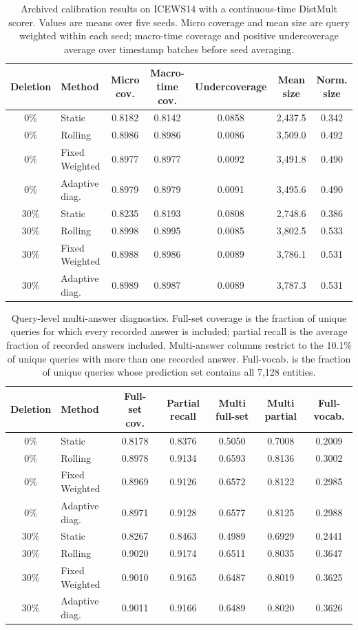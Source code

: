 \documentclass[10pt,twocolumn]{article}
\begin{document}
\begin{table}[t]
\centering
\caption{Archived calibration results on ICEWS14 with a continuous-time
DistMult scorer. Values are means over five seeds. Micro coverage and mean
size are query weighted within each seed; macro-time coverage and positive
undercoverage average over timestamp batches before seed averaging.}
\label{tab:calibration}
\begin{tabular}{clccccc}
\toprule
Deletion & Method & Micro cov. & Macro-time cov. & Undercoverage & Mean size & Norm. size\\
\midrule
0\% & Static & 0.8182 & 0.8142 & 0.0858 & 2,437.5 & 0.342\\
0\% & Rolling & 0.8986 & 0.8986 & 0.0086 & 3,509.0 & 0.492\\
0\% & Fixed Weighted & 0.8977 & 0.8977 & 0.0092 & 3,491.8 & 0.490\\
0\% & Adaptive diag. & 0.8979 & 0.8979 & 0.0091 & 3,495.6 & 0.490\\
\midrule
30\% & Static & 0.8235 & 0.8193 & 0.0808 & 2,748.6 & 0.386\\
30\% & Rolling & 0.8998 & 0.8995 & 0.0085 & 3,802.5 & 0.533\\
30\% & Fixed Weighted & 0.8988 & 0.8986 & 0.0089 & 3,786.1 & 0.531\\
30\% & Adaptive diag. & 0.8989 & 0.8987 & 0.0089 & 3,787.3 & 0.531\\
\bottomrule
\end{tabular}
\end{table}

\begin{table}[t]
\centering
\caption{Query-level multi-answer diagnostics. Full-set coverage is the
fraction of unique queries for which every recorded answer is included; partial
recall is the average fraction of recorded answers included. Multi-answer
columns restrict to the 10.1\% of unique queries with more than one recorded
answer. Full-vocab. is the fraction of unique queries whose prediction set
contains all 7,128 entities.}
\label{tab:query-level}
\footnotesize
\setlength{\tabcolsep}{4pt}
\begin{tabular}{clccccc}
\toprule
Deletion & Method & Full-set cov. & Partial recall & Multi full-set & Multi partial & Full-vocab.\\
\midrule
0\% & Static & 0.8178 & 0.8376 & 0.5050 & 0.7008 & 0.2009\\
0\% & Rolling & 0.8978 & 0.9134 & 0.6593 & 0.8136 & 0.3002\\
0\% & Fixed Weighted & 0.8969 & 0.9126 & 0.6572 & 0.8122 & 0.2985\\
0\% & Adaptive diag. & 0.8971 & 0.9128 & 0.6577 & 0.8125 & 0.2988\\
\midrule
30\% & Static & 0.8267 & 0.8463 & 0.4989 & 0.6929 & 0.2441\\
30\% & Rolling & 0.9020 & 0.9174 & 0.6511 & 0.8035 & 0.3647\\
30\% & Fixed Weighted & 0.9010 & 0.9165 & 0.6487 & 0.8019 & 0.3625\\
30\% & Adaptive diag. & 0.9011 & 0.9166 & 0.6489 & 0.8020 & 0.3626\\
\bottomrule
\end{tabular}
\end{table}
\end{document}
